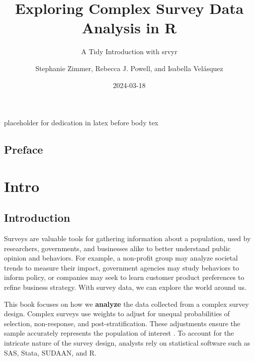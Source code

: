 \documentclass[
]{krantz}
\title{Exploring Complex Survey Data Analysis in R}
\subtitle{A Tidy Introduction with srvyr}
\author{Stephanie Zimmer, Rebecca J. Powell, and Isabella Velásquez}
\date{2024-03-18}
\begin{document}
\maketitle


\thispagestyle{empty}

\begin{center}
placeholder for dedication in latex before body tex
\end{center}

\setlength{\abovedisplayskip}{-5pt}
\setlength{\abovedisplayshortskip}{-5pt}

{
\hypersetup{linkcolor=}
\setcounter{tocdepth}{1}
\tableofcontents
}
\listoffigures
\listoftables
{}

\hypertarget{preface}{%
\chapter*{Preface}\label{preface}}


\mainmatter

\hypertarget{part-intro}{%
\part{Intro}\label{part-intro}}

\hypertarget{c01-intro}{%
\chapter{Introduction}\label{c01-intro}}

Surveys are valuable tools for gathering information about a population, used by researchers, governments, and businesses alike to better understand public opinion and behaviors. For example, a non-profit group may analyze societal trends to measure their impact, government agencies may study behaviors to inform policy, or companies may seek to learn customer product preferences to refine business strategy. With survey data, we can explore the world around us.

This book focuses on how we \textbf{analyze} the data collected from a complex survey design. Complex surveys use weights to adjust for unequal probabilities of selection, non-response, and post-stratification. These adjustments ensure the sample accurately represents the population of interest \citep{gard2023weightsdef}. To account for the intricate nature of the survey design, analysts rely on statistical software such as SAS, Stata, SUDAAN, and R.
\end{document}
